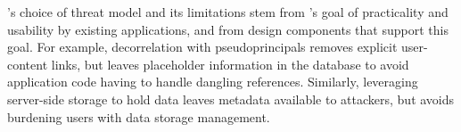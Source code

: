 \sys's choice of threat model and its limitations stem from
\sys's goal of practicality and usability by existing applications, and
from design components that support this goal.
%
For example, decorrelation with pseudoprincipals removes explicit user-content
links, but leaves placeholder information in the database to avoid application
code having to handle dangling references.
%
Similarly, leveraging server-side storage to hold \xxed data leaves
metadata available to attackers, but avoids burdening users with data storage
management.
